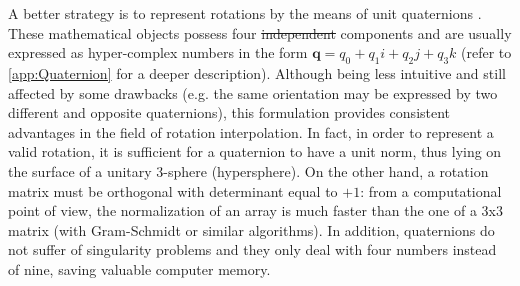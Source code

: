 \documentclass[preprint, 12pt]{elsarticle}
\def\quat#1{{\boldsymbol{#1}}}
\providecommand{\DIFdel}[1]{{\protect\color{red}\sout{#1}}}                      %
\providecommand{\DIFdelbegin}{} %
\providecommand{\DIFdelend}{} %
\begin{document}
A better strategy is to represent rotations by the means of unit quaternions \cite{hamilton1844ii}. These mathematical objects possess four \DIFdelbegin \DIFdel{independent }\DIFdelend components and are usually expressed as hyper-complex numbers in the form $\quat{q} = q_0 + q_{1} i + q_{2} j + q_{3} k$ (refer to \ref{app:Quaternion} for a deeper description). Although being less intuitive and still affected by some drawbacks (e.g. the same orientation may be expressed by two different and opposite quaternions), this formulation provides consistent advantages in the field of rotation interpolation. In fact, in order to represent a valid rotation, it is sufficient for a quaternion to have a unit norm, thus lying on the surface of a unitary 3-sphere (hypersphere). On the other hand, a rotation matrix must be orthogonal with determinant equal to $+1$: from a computational point of view, the normalization of an array is much faster than the one of a 3x3 matrix (with Gram-Schmidt or similar algorithms). In addition, quaternions do not suffer of singularity problems and they only deal with four numbers instead of nine, saving valuable computer memory.
\end{document}
